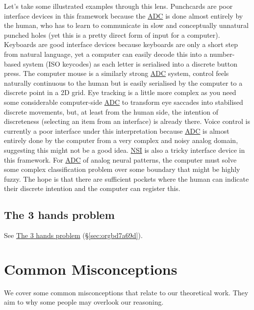 \documentclass[logo,bsc,singlespacing,parskip]{infthesis}
\begin{document}
Let's take some illustrated examples through this lens.
Punchcards are poor interface devices in this framework because the \hyperref[org633bfb2]{ADC} is done almost entirely by the human, who has to learn to communicate in slow and conceptually unnatural punched holes (yet this is a pretty direct form of input for a computer).
Keyboards are good interface devices because keyboards are only a short step from natural language, yet a computer can easily decode this into a number-based system (ISO keycodes) as each letter is serialised into a discrete button press.
The computer mouse is a similarly strong \hyperref[org633bfb2]{ADC} system, control feels naturally continuous to the human but is easily serialised by the computer to a discrete point in a 2D grid.
Eye tracking is a little more complex as you need some considerable computer-side \hyperref[org633bfb2]{ADC} to transform eye saccades into stabilised discrete movements, but, at least from the human side, the intention of discreteness (selecting an item from an interface) is already there.
Voice control is currently a poor interface under this interpretation because \hyperref[org633bfb2]{ADC} is almost entirely done by the computer from a very complex and noisy analog domain, suggesting this might not be a good idea.
\hyperref[org5662848]{NSI} is also a tricky interface device in this framework.
For \hyperref[org633bfb2]{ADC} of analog neural patterns, the computer must solve some complex classification problem over some boundary that might be highly fuzzy.
The hope is that there are sufficient pockets where the human can indicate their discrete intention and the computer can register this.

\section{The 3 hands problem}
\label{sec:org64d7c3b}

See \hyperref[sec:orgbd7a69d]{The 3 hands problem} (\S \ref{sec:orgbd7a69d}).
\chapter{Common Misconceptions}
\label{sec:orgdf8952a}
We cover some common misconceptions that relate to our theoretical work.
They aim to why some people may overlook our reasoning.
\end{document}

